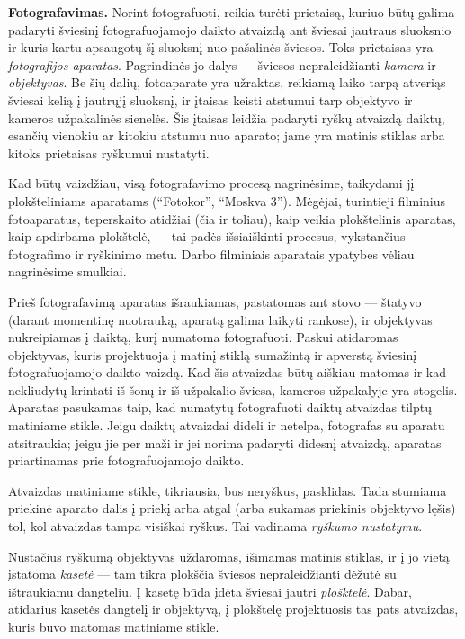 \documentclass[12pt]{book}
\begin{document}
			\textbf{Fotografavimas.} Norint fotografuoti, reikia turėti prietaisą, kuriuo būtų galima padaryti šviesinį fotografuojamojo daikto atvaizdą ant šviesai jautraus sluoksnio ir kuris kartu apsaugotų šį sluoksnį nuo pašalinės šviesos. Toks prietaisas yra \textit{fotografijos aparatas}. Pagrindinės jo dalys --- šviesos nepraleidžianti \textit{kamera} ir \textit{objektyvas}. Be šių dalių, fotoaparate yra užraktas, reikiamą laiko tarpą atveriąs šviesai kelią į jautrųjį sluoksnį, ir įtaisas keisti atstumui tarp objektyvo ir kameros užpakalinės sienelės. Šis įtaisas leidžia padaryti ryškų atvaizdą daiktų, esančių vienokiu ar kitokiu atstumu nuo aparato; jame yra matinis stiklas arba kitoks prietaisas ryškumui nustatyti.

			Kad būtų vaizdžiau, visą fotografavimo procesą nagrinėsime, taikydami jį plokšteliniams aparatams (``Fotokor'', ``Moskva 3''). Mėgėjai, turintieji filminius fotoaparatus, teperskaito atidžiai (čia ir toliau), kaip veikia plokštelinis aparatas, kaip apdirbama plokštelė, --- tai padės išsiaiškinti procesus, vykstančius fotografimo ir ryškinimo metu. Darbo filminiais aparatais ypatybes vėliau nagrinėsime smulkiai.

			Prieš fotografavimą aparatas išraukiamas, pastatomas ant stovo --- štatyvo (darant momentinę nuotrauką, aparatą galima laikyti rankose), ir objektyvas nukreipiamas į daiktą, kurį numatoma fotografuoti. Paskui atidaromas objektyvas, kuris projektuoja į matinį stiklą sumažintą ir apverstą šviesinį fotografuojamojo daikto vaizdą. Kad šis atvaizdas būtų aiškiau matomas ir kad nekliudytų krintati iš šonų ir iš užpakalio šviesa, kameros užpakalyje yra stogelis. Aparatas pasukamas taip, kad numatytų fotografuoti daiktų atvaizdas tilptų matiniame stikle. Jeigu daiktų atvaizdai dideli ir netelpa, fotografas su aparatu atsitraukia; jeigu jie per maži ir jei norima padaryti didesnį atvaizdą, aparatas priartinamas prie fotografuojamojo daikto.

			Atvaizdas matiniame stikle, tikriausia, bus neryškus, pasklidas. Tada stumiama priekinė aparato dalis į priekį arba atgal (arba sukamas priekinis objektyvo lęšis) tol, kol atvaizdas tampa visiškai ryškus. Tai vadinama \textit{ryškumo nustatymu}.

			Nustačius ryškumą objektyvas uždaromas, išimamas matinis stiklas, ir į jo vietą įstatoma \textit{kasetė} --- tam tikra plokščia šviesos nepraleidžianti dėžutė su ištraukiamu dangteliu. Į kasetę būda įdėta šviesai jautri \textit{plošktelė}. Dabar, atidarius kasetės dangtelį ir objektyvą, į plokštelę projektuosis tas pats atvaizdas, kuris buvo matomas matiniame stikle.
\end{document}

